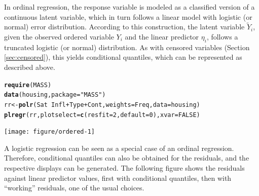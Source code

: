 \documentclass[11pt]{article}\usepackage[]{graphicx}\usepackage[]{color}
\makeatletter
\newcommand{\hlnum}[1]{\textcolor[rgb]{0.686,0.059,0.569}{#1}}%
\newcommand{\hlstr}[1]{\textcolor[rgb]{0.192,0.494,0.8}{#1}}%
\newcommand{\hlopt}[1]{\textcolor[rgb]{0,0,0}{#1}}%
\newcommand{\hlstd}[1]{\textcolor[rgb]{0.345,0.345,0.345}{#1}}%
\newcommand{\hlkwb}[1]{\textcolor[rgb]{0.69,0.353,0.396}{#1}}%
\newcommand{\hlkwc}[1]{\textcolor[rgb]{0.333,0.667,0.333}{#1}}%
\newcommand{\hlkwd}[1]{\textcolor[rgb]{0.737,0.353,0.396}{\textbf{#1}}}%
\newenvironment{kframe}{%
 \def\at@end@of@kframe{}%
 \ifinner\ifhmode%
  \def\at@end@of@kframe{\end{minipage}}%
  \begin{minipage}{\columnwidth}%
 \fi\fi%
 \def\FrameCommand##1{\hskip\@totalleftmargin \hskip-\fboxsep
 \colorbox{shadecolor}{##1}\hskip-\fboxsep
     \hskip-\linewidth \hskip-\@totalleftmargin \hskip\columnwidth}%
 \MakeFramed {\advance\hsize-\width
   \@totalleftmargin\z@ \linewidth\hsize
   \@setminipage}}%
 {\par\unskip\endMakeFramed%
 \at@end@of@kframe}
\newenvironment{knitrout}{}{} %
\makeatother
\begin{document}
In ordinal regression, the response variable is modeled as a classified
version of a continuous latent variable, which in turn follows a linear
model with logistic (or normal) error distribution.
According to this construction, the latent variable $\widetilde Y_i$, given the
observed ordered variable $Y_i$ and the linear predictor $\eta_i$, 
follows a truncated logistic (or normal) distribution. 
As with censored variables (Section \ref{sec:censored}), this yields 
conditional quantiles, which can be represented as described above.

\begin{knitrout}
\color{fgcolor}\begin{kframe}
\begin{alltt}
\hlkwd{require}\hlstd{(MASS)}
\hlkwd{data}\hlstd{(housing,} \hlkwc{package}\hlstd{=}\hlstr{"MASS"}\hlstd{)}
\hlstd{rr} \hlkwb{<-} \hlkwd{polr}\hlstd{(Sat} \hlopt{~} \hlstd{Infl} \hlopt{+} \hlstd{Type} \hlopt{+} \hlstd{Cont,} \hlkwc{weights} \hlstd{= Freq,} \hlkwc{data} \hlstd{= housing)}
\hlkwd{plregr}\hlstd{(rr,} \hlkwc{plotselect}\hlstd{=}\hlkwd{c}\hlstd{(}\hlkwc{resfit}\hlstd{=}\hlnum{2}\hlstd{,} \hlkwc{default}\hlstd{=}\hlnum{0}\hlstd{),} \hlkwc{xvar}\hlstd{=}\hlnum{FALSE}\hlstd{)}
\end{alltt}


{\ttfamily\noindent\itshape\color{messagecolor}{\#\# \\\#\# Re-fitting to get Hessian}}\end{kframe}
\texttt{[image: figure/ordered-1]} 

\end{knitrout}

A logistic regression can be seen as a special case of an ordinal regression.
Therefore, conditional quantiles can also be obtained for the residuals,
and the respective displays can be generated.
The following figure shows the residuals against linear predictor values,
first with conditional quantiles, then with ``working'' residuals,
one of the usual choices.
\end{document}
